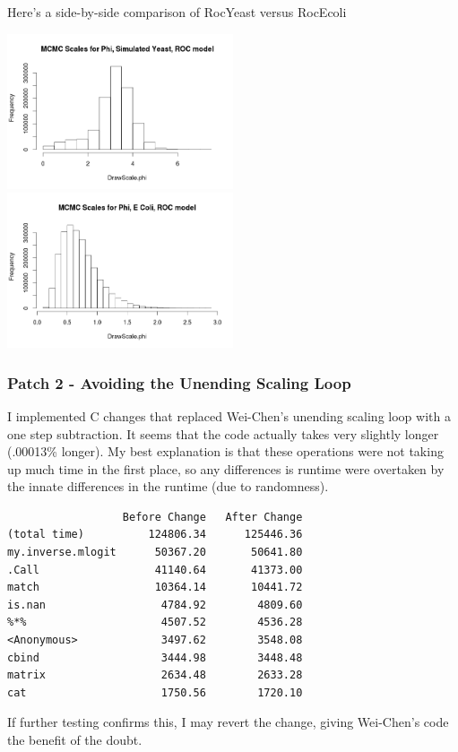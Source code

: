 Here's a side-by-side comparison of RocYeast versus RocEcoli


\includegraphics[width=0.5\textwidth]{data/oct17-RocYeastScales.png}
\includegraphics[width=0.5\textwidth]{data/oct20-RocEcoliScales.png}

\subsubsection{Patch 2 - Avoiding the Unending Scaling Loop}

I implemented C changes that replaced Wei-Chen's unending scaling loop with a one step subtraction. It seems that the code actually takes very slightly longer (.00013\% longer). My best explanation is that these operations were not taking up much time in the first place, so any differences is runtime were overtaken by the innate differences in the runtime (due to randomness).

\begin{verbatim}
                  Before Change   After Change
(total time)          124806.34      125446.36
my.inverse.mlogit      50367.20       50641.80
.Call                  41140.64       41373.00
match                  10364.14       10441.72
is.nan                  4784.92        4809.60
%*%                     4507.52        4536.28
<Anonymous>             3497.62        3548.08
cbind                   3444.98        3448.48
matrix                  2634.48        2633.28
cat                     1750.56        1720.10
\end{verbatim}

If further testing confirms this, I may revert the change, giving Wei-Chen's code the benefit of the doubt.

